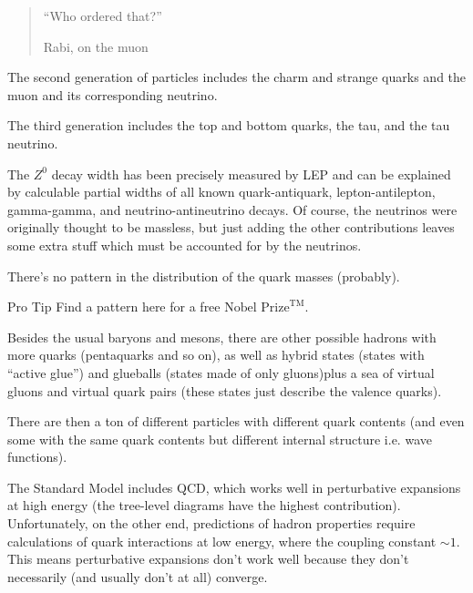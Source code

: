 \documentclass[a4paper,twoside,master.tex]{subfiles}
\begin{document}
\begin{quote}
    ``Who ordered that?''
    
    \textemdash Rabi, on the muon
\end{quote}

The second generation of particles includes the charm and strange quarks and the muon and its corresponding neutrino.

The third generation includes the top and bottom quarks, the tau, and the tau neutrino.

The $ Z^0 $ decay width has been precisely measured by LEP and can be explained by calculable partial widths of all known quark-antiquark, lepton-antilepton, gamma-gamma, and neutrino-antineutrino decays. Of course, the neutrinos were originally thought to be massless, but just adding the other contributions leaves some extra stuff which must be accounted for by the neutrinos.

There's no pattern in the distribution of the quark masses (probably).
\begin{note}{Pro Tip}
    Find a pattern here for a free $ \text{Nobel Prize}^{\text{TM}} $.
\end{note}

Besides the usual baryons and mesons, there are other possible hadrons with more quarks (pentaquarks and so on), as well as hybrid states (states with ``active glue'') and glueballs (states made of only gluons)\textemdash plus a sea of virtual gluons and virtual quark pairs (these states just describe the valence quarks).

There are then a ton of different particles with different quark contents (and even some with the same quark contents but different internal structure i.e. wave functions).

The Standard Model includes QCD, which works well in perturbative expansions at high energy (the tree-level diagrams have the highest contribution). Unfortunately, on the other end, predictions of hadron properties require calculations of quark interactions at low energy, where the coupling constant $ \sim 1 $. This means perturbative expansions don't work well because they don't necessarily (and usually don't at all) converge.
\end{document}
